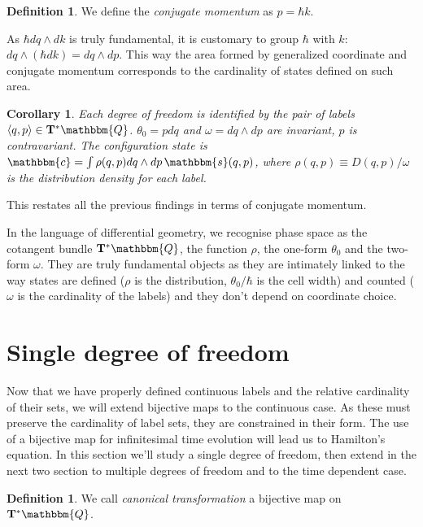 \documentclass[aps,pra,10pt,twocolumn,floatfix,nofootinbib]{revtex4-1}
\newtheorem{cor}[thm]{Corollary}
\theoremstyle{definition}
\newtheorem{defn}[thm]{Definition}
\begin{document}
\begin{defn}\label{conjugateMomentum}
We define the \emph{conjugate momentum} as $p=\hbar k$.
\end{defn}

As $\hbar dq \wedge dk$ is truly fundamental, it is customary to group $\hbar$ with $k$: $dq \wedge (\hbar dk) = dq \wedge dp$. This way the area formed by generalized coordinate and conjugate momentum corresponds to the cardinality of states defined on such area.

\begin{cor}\label{continuousConjugateRelationships}
Each degree of freedom is identified by the pair of labels $\langle q,p \rangle \in \mathbf{T}^*\mathbbm{Q}$. $\theta_0 = p dq$ and $\omega = dq \wedge dp$ are invariant, $p$ is contravariant. The configuration state is $\mathbbm{c}=\int \rho(q,p) dq \wedge dp \, \mathbbm{s}(q, p)$, where $\rho(q,p)\equiv D(q,p) / \omega$ is the distribution density for each label.
\end{cor}

This restates all the previous findings in terms of conjugate momentum.

In the language of differential geometry, we recognise phase space as the cotangent bundle $\mathbf{T}^*\mathbbm{Q}$, the function $\rho$, the one-form $\theta_0$ and the two-form $\omega$. They are truly fundamental objects as they are intimately linked to the way states are defined ($\rho$ is the distribution, $\theta_0 / \hbar$ is the cell width) and counted ($\omega$ is the cardinality of the labels) and they don't depend on coordinate choice.

\section{Single degree of freedom}

Now that we have properly defined continuous labels and the relative cardinality of their sets, we will extend bijective maps to the continuous case. As these must preserve the cardinality of label sets, they are constrained in their form. The use of a bijective map for infinitesimal time evolution will lead us to Hamilton's equation. In this section we'll study a single degree of freedom, then extend in the next two section to multiple degrees of freedom and to the time dependent case.

\begin{defn}\label{canonical}
We call \emph{canonical transformation} a bijective map on $\mathbf{T}^*\mathbbm{Q}$.
\end{defn}
\end{document}
